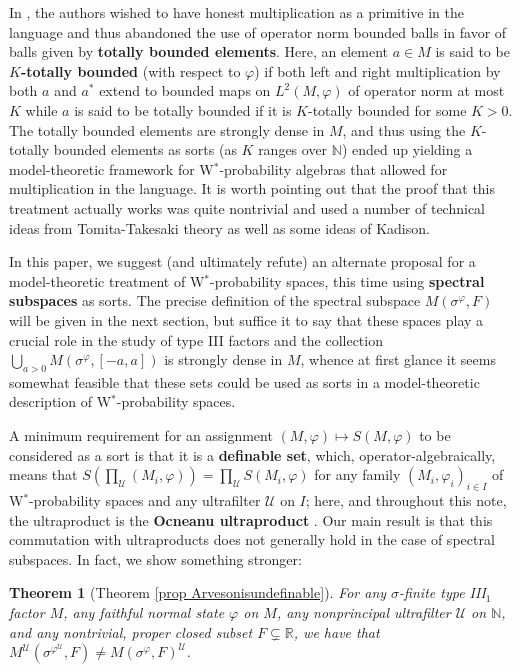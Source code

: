 \documentclass[12pt]{amsart}
\newtheorem*{thm*}{Theorem}
\theoremstyle{definition}
\def\bb{\mathbb}
\def\bb{\mathbb}
\def\u{\mathsf 1}
\def \u{\mathcal U}
\begin{document}
In \cite{AGHS25}, the authors wished to have honest multiplication as a primitive in the language and thus abandoned the use of operator norm bounded balls in favor of balls given by \textbf{totally bounded elements}.  Here, an element $a\in M$ is said to be \textbf{$K$-totally bounded} (with respect to $\varphi$) if both left and right multiplication by both $a$ and $a^*$ extend to bounded maps on $L^2(M,\varphi)$ of operator norm at most $K$ while $a$ is said to be totally bounded if it is $K$-totally bounded for some $K>0$.  The totally bounded elements are strongly dense in $M$, and thus using the $K$-totally bounded elements as sorts (as $K$ ranges over $\bb N$) ended up yielding a model-theoretic framework for W$^*$-probability algebras that allowed for multiplication in the language.  It is worth pointing out that the proof that this treatment actually works was quite nontrivial and used a number of technical ideas from Tomita-Takesaki theory as well as some ideas of Kadison.

In this paper, we suggest (and ultimately refute) an alternate proposal for a model-theoretic treatment of W$^*$-probability spaces, this time using \textbf{spectral subspaces} as sorts.  The precise definition of the spectral subspace $M(\sigma^\varphi,F)$ will be given in the next section, but suffice it to say that these spaces play a crucial role in the study of type III factors and the collection $\bigcup_{a>0}M(\sigma^\varphi,[-a,a])$ is strongly dense in $M$, whence at first glance it seems somewhat feasible that these sets could be used as sorts in a model-theoretic description of W$^*$-probability spaces.

A minimum requirement for an assignment $(M,\varphi)\mapsto S(M,\varphi)$ to be considered as a sort is that it is a \textbf{definable set}, which, operator-algebraically, means that $S(\prod_\u (M_i,\varphi))=\prod_\u S(M_i,\varphi)$ for any family $(M_i,\varphi_i)_{i\in I}$ of W$^*$-probability spaces and any ultrafilter $\u$ on $I$; here, and throughout this note, the ultraproduct is the \textbf{Ocneanu ultraproduct} \cite{AH14,Ocneanu85}. Our main result is that this commutation with ultraproducts does not generally hold in the case of spectral subspaces.  In fact, we show something stronger:

\begin{thm*}[Theorem \ref{prop Arvesonisundefinable}]
For any $\sigma$-finite type III$_1$ factor $M$, any faithful normal state $\varphi$ on $M$, any nonprincipal ultrafilter $\u$ on $\mathbb{N}$, and any nontrivial, proper closed subset $F\subsetneq \bb R$, we have that $M^\u(\sigma^{\varphi^\u},F)\not=M(\sigma^\varphi,F)^\u$. 
\end{thm*}
\end{document}
